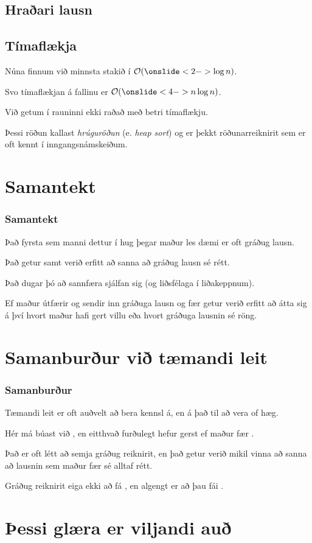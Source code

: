 \subsection{Hraðari lausn}
{
}

\subsection{Tímaflækja}
{
    {
        \item<1-> Núna finnum við minnsta stakið í $\mathcal{O}(\onslide<2->{\log n})$.
        \item<3-> Svo tímaflækjan á fallinu er $\mathcal{O}(\onslide<4->{n \log n})$.
        \item<5-> Við getum í rauninni ekki raðað með betri tímaflækju.
        \item<6-> Þessi röðun kallast \emph{hrúguröðun} (e. \emph{heap sort}) og er þekkt röðunarreiknirit sem er oft kennt í inngangsnámskeiðum.
    }
}

\section{Samantekt}
{
    \frametitle{Samantekt}
    {
        \item<1-> Það fyrsta sem manni dettur í hug þegar maður les dæmi er oft gráðug lausn.
        \item<2-> Það getur samt verið erfitt að sanna að gráðug lausn sé rétt.
        \item<3-> Það dugar þó að sannfæra sjálfan sig (og liðsfélaga í liðakeppnum).
        \item<4-> Ef maður útfærir og sendir inn gráðuga lausn og fær 
            getur verið erfitt að átta sig á því hvort maður hafi gert villu eða hvort gráðuga lausnin sé röng.
    }
}

\section{Samanburður við tæmandi leit}
{
    \frametitle{Samanburður}
    {
        \item<1-> Tæmandi leit er oft auðvelt að bera kennsl á, en á það til að vera of hæg. 
        \item<2-> Hér má búast við , en eitthvað furðulegt hefur gerst ef maður fær .
        \item<3-> Það er oft létt að semja gráðug reiknirit, en það getur verið mikil vinna að sanna að lausnin sem maður fær sé alltaf rétt.
        \item<4-> Gráðug reiknirit eiga ekki að fá , en algengt er að þau fái .
    }
}

\section{Þessi glæra er viljandi auð}
{
}


